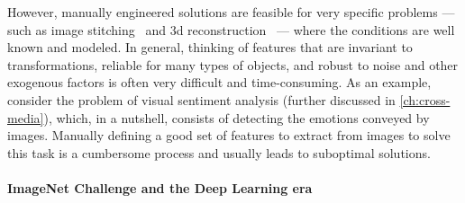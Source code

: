 However, manually engineered solutions are feasible for very specific problems --- such as image stitching~\cite{brown2007automatic} and 3d reconstruction~\cite{schonberger2016structure} --- where the conditions are well known and modeled.
In general, thinking of features that are invariant to transformations, reliable for many types of objects, and robust to noise and other exogenous factors is often very difficult and time-consuming.
As an example, consider the problem of visual sentiment analysis (further discussed in \ref{ch:cross-media}), which, in a nutshell, consists of detecting the emotions conveyed by images.
Manually defining a good set of features to extract from images to solve this task is a cumbersome process and usually leads to suboptimal solutions.

\paragraph{ImageNet Challenge and the Deep Learning era}

